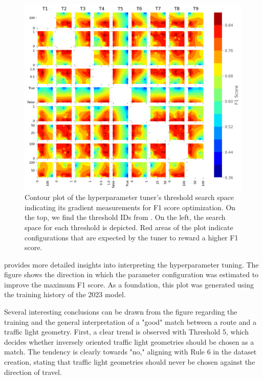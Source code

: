 \begin{figure}[!t]
\centering 
\includegraphics[width=\linewidth]{images/matching-hpt-contour-topological-osm-updated.png}
\caption{Contour plot of the hyperparameter tuner's threshold search space indicating its gradient measurements for F1 score optimization. On the top, we find the threshold IDs from . On the left, the search space for each threshold is depicted. Red areas of the plot indicate configurations that are expected by the tuner to reward a higher F1 score.}
\label{fig:hyperparameter-contourplot}
\end{figure}

 provides more detailed insights into interpreting the hyperparameter tuning. The figure shows the direction in which the parameter configuration was estimated to improve the maximum F1 score. As a foundation, this plot was generated using the training history of the 2023 model.

Several interesting conclusions can be drawn from the figure regarding the training and the general interpretation of a "good" match between a route and a traffic light geometry. First, a clear trend is observed with Threshold 5, which decides whether inversely oriented traffic light geometries should be chosen as a match. The tendency is clearly towards "no," aligning with Rule 6 in the dataset creation, stating that traffic light geometries should never be chosen against the direction of travel. 

